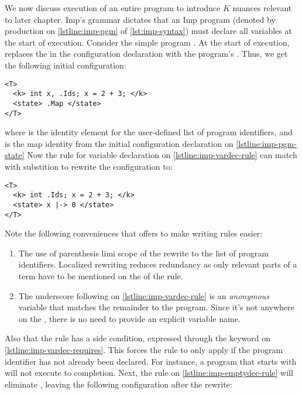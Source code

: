 We now discuss execution of an entire program to introduce $K{}$ nuances
relevant to later chapter. Imp's grammar dictates that an
Imp program (denoted by production  on
\autoref{lstline:imp-pgm} of \autoref{lst:imp-syntax})
must declare all variables at the start of execution. Consider
the simple program .
At the start of execution, \K{} replaces the 
in the configuration declaration with the program's \AST{}.
Thus, we get the following initial configuration:
\begin{lstlisting}[language=k,style=ksty]
<T>
  <k> int x, .Ids; x = 2 + 3; </k>
  <state> .Map </state>
</T>
\end{lstlisting}
where  is the identity element for the user-defined
list of program identifiers, and  is the map identity
from the initial configuration declaration on \autoref{lstline:imp-pgm-state}
Now the rule for variable declaration on \autoref{lstline:imp-vardec-rule}
can match with substition 
to rewrite the configuration to:
\begin{lstlisting}[language=k,style=ksty]
<T>
  <k> int .Ids; x = 2 + 3; </k>
  <state> x |-> 0 </state>
</T>
\end{lstlisting}
Note the following conveniences that \K{} offers to make writing rules easier:
\begin{enumerate}[label=\roman*)]
  \item The use of parenthesis limi scope of the rewrite to the
    list of program identifiers. Localized rewriting reduces redundancy
    as only relevant parts of a term have to be mentioned on the \RHS{} of the
    rule.
  \item The underscore \inlinek{_} following 
    on \autoref{lstline:imp-vardec-rule}
    is an \emph{anonymous} variable that matches the remainder to the program.
    Since it's not anywhere on the \RHS{}, there is no need to provide an
    explicit variable name.
\end{enumerate}
Also that the rule has a side condition, expressed through the keyword 
on \autoref{lstline:imp-vardec-requires}. This forces the rule to only apply if
the program identifier has not already been declared. For instance,
a program that starts with  will not execute to completion.
Next, the rule on \autoref{lstline:imp-emptydec-rule} will eliminate
, leaving the following configuration after the rewrite:
